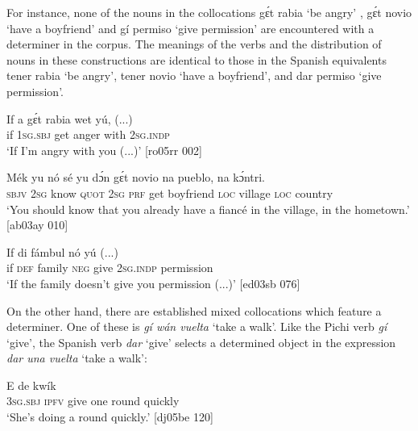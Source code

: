 For instance, none of the nouns in the collocations gɛ́t rabia ‘be angry’ , gɛ́t novio ‘have a boyfriend’  and gí permiso ‘give permission’  are encountered with a determiner in the corpus. The meanings of the verbs and the distribution of nouns in these constructions are identical to those in the Spanish equivalents tener rabia ‘be angry’, tener novio ‘have a boyfriend’, and dar permiso ‘give permission’. 



\ea%
    \label{ex:key:1166}
    \gll If  a    gɛ́t  rabia  wet    yú,    (...)\\
if  \textsc{1sg.sbj}  get  anger  with    \textsc{2sg.indp}\\
\glt ‘If I’m angry with you (...)’  [ro05rr 002]
\z

\ea%
    \label{ex:key:1167}
    \gll Mék  yu  nó    sé    yu  dɔ́n  gɛ́t  novio    na
pueblo,  na  kɔ́ntri.\\
\textsc{sbjv}  \textsc{2sg}  know  \textsc{quot}    \textsc{2sg}  \textsc{prf}  get  boyfriend  \textsc{loc}
village  \textsc{loc}  country\\

\glt ‘You should know that you already have a fiancé in the village, 
in the hometown.’ [ab03ay 010]
\z


\ea%
    \label{ex:key:1168}
    \gll If  di  fámbul  nó    yú        (...)\\
if  \textsc{def}  family  \textsc{neg}  give  \textsc{2sg.indp}  permission\\

\glt ‘If the family doesn’t give you permission (...)’ [ed03sb 076]
\z

On the other hand, there are established mixed collocations which feature a determiner. One of these is \textit{gí wán vuelta} ‘take a walk’. Like the Pichi verb \textit{gí} ‘give’, the Spanish verb \textit{dar} ‘give’ selects a determined object in the expression \textit{dar una vuelta} ‘take a walk’: 


\ea%
    \label{ex:key:1169}
    \gll E    de          kwík\\
\textsc{3sg.sbj}  \textsc{ipfv}  give  one    round  quickly\\

\glt ‘She’s doing a round quickly.’ [dj05be 120]
\z

